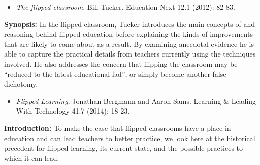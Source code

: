 \documentclass[12pt,a4paper,twoside]{report}
\begin{document}
\begin{itemize}
	\item \textit{The flipped classroom}. Bill Tucker. Education Next 12.1 (2012): 82-83.
\end{itemize}

\noindent \textbf{Synopsis:} In the flipped classroom, Tucker introduces the main concepts of and reasoning behind flipped education before explaining the kinds of improvements that are likely to come about as a result. By examining anecdotal evidence he is able to capture the practical details from teachers currently using the techniques involved. He also addresses the concern that flipping the classroom may be ``reduced to the latest educational fad'', or simply become another false dichotomy.

\begin{itemize}
	\item \textit{Flipped Learning}. Jonathan Bergmann and Aaron Sams. Learning \& Leading With Technology 41.7 (2014): 18-23.
\end{itemize}

\noindent \textbf{Introduction:} To make the case that flipped classrooms have a place in education and can lead teachers to better practice, we look here at the historical precedent for flipped learning, its current state, and the possible practices to which it can lead.
\end{document}
